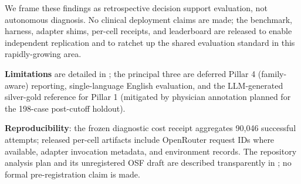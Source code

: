 We frame these findings as retrospective decision support evaluation, not autonomous diagnosis. No clinical deployment claims are made; the
benchmark, harness, adapter shims, per-cell receipts, and leaderboard
are released to enable independent replication and to ratchet up the
shared evaluation standard in this rapidly-growing area.

\textbf{Limitations} are detailed in ; the principal three are deferred
Pillar 4 (family-aware) reporting, single-language English evaluation,
and the LLM-generated silver-gold reference for Pillar 1 (mitigated by
physician annotation planned for the 198-case post-cutoff holdout).

\textbf{Reproducibility}: the frozen diagnostic cost receipt aggregates 90,046
successful attempts; released per-cell artifacts include OpenRouter
request IDs where available, adapter invocation metadata, and environment
records. The repository analysis plan and its unregistered OSF draft are
described transparently in ; no formal pre-registration claim is made.

